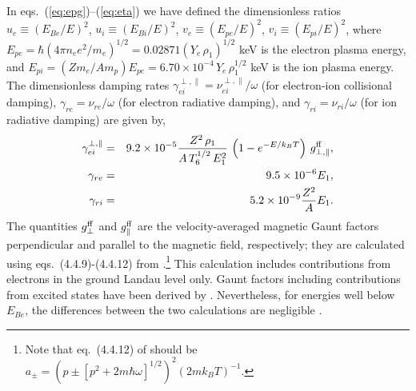 \documentclass[useAMS,onecolumn,usenatbib,usegraphicx]{mn2e}
\begin{document}
In eqs.~(\ref{eq:epg})--(\ref{eq:eta}) we have defined the dimensionless ratios $u_e\equiv (E_{Be}/E)^2$, 
$u_i\equiv (E_{Bi}/E)^2$, $v_e\equiv (E_{pe}/E)^2$, $v_i\equiv (E_{pi}/E)^2$, 
where $E_{pe} = \hbar (4\pi n_e e^2 / m_e)^{1/2} = 0.02871 (Y_e\,\rho_1)^{1/2}$ keV is the electron plasma energy, and 
$E_{pi} = (Z m_e / A m_p) E_{pe} = 6.70 \times 10^{-4}\, Y_e\, \rho_1^{1/2}$ keV is the ion plasma energy.
The dimensionless damping rates $\gamma_{ei}^{\perp,\parallel} = \nu_{ei}^{\perp,\parallel}/\omega$
(for electron-ion collisional damping), 
$\gamma_{re}=\nu_{re}/\omega$ (for electron radiative damping), and 
$\gamma_{ri}=\nu_{ri}/\omega$ (for ion radiative damping)
are given by,
\begin{eqnarray}
\gamma_{ei}^{\perp,\parallel} & = & 9.2\times 10^{-5}{Z^2\, \rho_1\over A\, T_6^{1/2}\, E_1^2}\,\left(1-e^{-E/k_B T}\right)\, 
	g^{\rm ff}_{\perp,\parallel},\\
\gamma_{re} & = & 9.5\times 10^{-6} E_1,\\
\gamma_{ri} & = & 5.2\times 10^{-9} {Z^2 \over A} E_1.
\end{eqnarray}
The quantities 
$g^{\rm ff}_{\perp}$ and $g^{\rm ff}_{\parallel}$ are the velocity-averaged magnetic Gaunt factors perpendicular and parallel to 
the magnetic field, respectively; they are calculated using eqs.~(4.4.9)-(4.4.12) 
from \citet[][]{Meszaros92a}.\footnote{Note that eq.~(4.4.12) of \citet[][]{Meszaros92a} should be 
$a_{\pm}=(p\pm[p^2+2m\hbar\omega]^{1/2})^2(2mk_B T)^{-1}$.}
This calculation includes contributions from electrons in the ground Landau level only.  Gaunt factors 
including contributions from excited states have been derived by \citet[][]{PotekhinChabrier04a}.  Nevertheless, for 
energies well below $E_{Be}$, the differences between the two calculations are negligible \citep[][]{Potekhin06a}.
\end{document}
